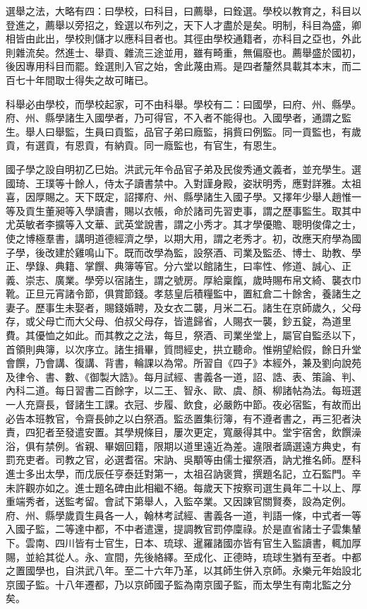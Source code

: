 
選舉之法，大略有四：曰學校，曰科目，曰薦舉，曰銓選。學校以教育之，科目以登進之，薦舉以旁招之，銓選以布列之，天下人才盡於是矣。明制，科目為盛，卿相皆由此出，學校則儲才以應科目者也。其徑由學校通籍者，亦科目之亞也，外此則雜流矣。然進士、舉貢、雜流三途並用，雖有畸重，無偏廢也。薦舉盛於國初，後因專用科目而罷。銓選則入官之始，舍此蔑由焉。是四者釐然具載其本末，而二百七十年間取士得失之故可睹已。

科舉必由學校，而學校起家，可不由科舉。學校有二：曰國學，曰府、州、縣學。府、州、縣學諸生入國學者，乃可得官，不入者不能得也。入國學者，通謂之監生。舉人曰舉監，生員曰貢監，品官子弟曰廕監，捐貲曰例監。同一貢監也，有歲貢，有選貢，有恩貢，有納貢。同一廕監也，有官生，有恩生。

國子學之設自明初乙巳始。洪武元年令品官子弟及民俊秀通文義者，並充學生。選國琦、王璞等十餘人，侍太子讀書禁中。入對謹身殿，姿狀明秀，應對詳雅。太祖喜，因厚賜之。天下既定，詔擇府、州、縣學諸生入國子學。又擇年少舉人趙惟一等及貢生董昶等入學讀書，賜以衣帳，命於諸司先習吏事，謂之歷事監生。取其中尤英敏者李擴等入文華、武英堂說書，謂之小秀才。其才學優贍、聰明俊偉之士，使之博極羣書，講明道德經濟之學，以期大用，謂之老秀才。初，改應天府學為國子學，後改建於雞鳴山下。既而改學為監，設祭酒、司業及監丞、博士、助教、學正、學錄、典籍、掌饌、典簿等官。分六堂以館諸生，曰率性、修道、誠心、正義、崇志、廣業。學旁以宿諸生，謂之號房。厚給稟餼，歲時賜布帛文綺、襲衣巾靴。正旦元宵諸令節，俱賞節錢。孝慈皇后積糧監中，置紅倉二十餘舍，養諸生之妻子。歷事生未娶者，賜錢婚聘，及女衣二襲，月米二石。諸生在京師歲久，父母存，或父母亡而大父母、伯叔父母存，皆遣歸省，人賜衣一襲，鈔五錠，為道里費。其優恤之如此。而其教之之法，每旦，祭酒、司業坐堂上，屬官自監丞以下，首領則典簿，以次序立。諸生揖畢，質問經史，拱立聽命。惟朔望給假，餘日升堂會饌，乃會講、復講、背書，輪課以為常。所習自《四子》本經外，兼及劉向說苑及律令、書、數、《御製大誥》。每月試經、書義各一道，詔、誥、表、策論、判、內科二道。每日習書二百餘字，以二王、智永、歐、虞、顏、柳諸帖為法。每班選一人充齋長，督諸生工課。衣冠、步履、飲食，必嚴飭中節。夜必宿監，有故而出必告本班教官，令齋長帥之以白祭酒。監丞置集衍簿，有不遵者書之，再三犯者決責，四犯者至發遣安置。其學規條目，屢次更定，寬嚴得其中。堂宇宿舍，飲饌澡浴，俱有禁例。省親、畢姻回籍，限期以道里遠近為差。違限者謫選遠方典史，有罰充吏者。司教之官，必選耆宿。宋訥、吳顒等由儒士擢祭酒，訥尤推名師。歷科進士多出太學，而戊辰任亨泰廷對第一，太祖召訥褒賞，撰題名記，立石監門。辛未許觀亦如之。進士題名碑由此相繼不絕。每歲天下按察司選生員年二十以上、厚重端秀者，送監考留。會試下第舉人，入監卒業。又因諫官關賢奏，設為定例。府、州、縣學歲貢生員各一人，翰林考試經、書義各一道，判語一條，中式者一等入國子監，二等達中都，不中者遣還，提調教官罰停廩祿。於是直省諸士子雲集輦下。雲南、四川皆有士官生，日本、琉球、暹羅諸國亦皆有官生入監讀書，輒加厚賜，並給其從人。永、宣間，先後絡繹。至成化、正德時，琉球生猶有至者。中都之置國學也，自洪武八年。至二十六年乃革，以其師生併入京師。永樂元年始設北京國子監。十八年遷都，乃以京師國子監為南京國子監，而太學生有南北監之分矣。

